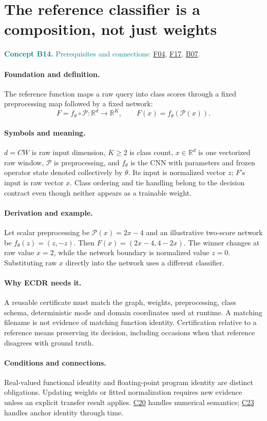 \documentclass[11pt,a4paper]{article}
\newcommand{\R}{\mathbb R}
\newcommand{\conceptid}{Front matter}
\newcommand{\concept}[3]{\clearpage\renewcommand{\conceptid}{#1}%
\section{#2}\label{concept:#1}%
\textcolor{teal}{\textbf{Concept #1.} Prerequisites and connections: #3.}\par
\typeout{ECDR-CONCEPT-START #1 PAGE=\thepage}}
\begin{document}
\concept{B14}{The reference classifier is a composition, not just weights}{\hyperref[concept:F04]{F04}, \hyperref[concept:F17]{F17}, \hyperref[concept:B07]{B07}}
\paragraph{Foundation and definition.}
The reference function maps a raw query into class scores through a fixed
preprocessing map followed by a fixed network:
\[
 F=f_\theta\circ\mathcal P:\R^d\to\R^K,
 \qquad F(x)=f_\theta(\mathcal P(x)).
\]
\paragraph{Symbols and meaning.}
$d=CW$ is raw input dimension, $K\ge2$ is class count,
$x\in\R^d$ is one vectorized raw window, $\mathcal P$ is preprocessing,
and $f_\theta$ is the CNN with parameters and frozen operator state
denoted collectively by $\theta$. Its input is normalized vector $z$;
$F$'s input is raw vector $x$. Class ordering and tie handling belong to
the decision contract even though neither appears as a trainable weight.
\paragraph{Derivation and example.}
Let scalar preprocessing be $\mathcal P(x)=2x-4$ and an illustrative
two-score network be $f_\theta(z)=(z,-z)$. Then
$F(x)=(2x-4,4-2x)$. The winner changes at raw value $x=2$, while the
network boundary is normalized value $z=0$. Substituting raw $x$ directly
into the network uses a different classifier.
\paragraph{Why ECDR needs it.}
A reusable certificate must match the graph, weights, preprocessing,
class schema, deterministic mode and domain coordinates used at runtime.
A matching filename is not evidence of matching function identity.
Certification relative to a reference means preserving its decision,
including occasions when that reference disagrees with ground truth.
\paragraph{Conditions and connections.}
Real-valued functional identity and floating-point program identity are
distinct obligations. Updating weights or fitted normalization requires
new evidence unless an explicit transfer result applies. \hyperref[concept:C20]{C20} handles
numerical semantics; \hyperref[concept:C23]{C23} handles anchor identity through time.
\par\label{endconcept:B14}
\end{document}
